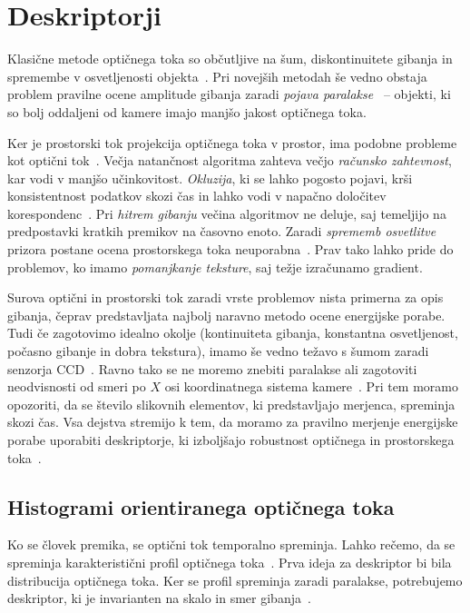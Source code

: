 \section{Deskriptorji}
Klasične metode optičnega toka so občutljive na šum, diskontinuitete gibanja in spremembe v osvetljenosti objekta~\cite{brox2011large}. Pri novejših metodah še vedno obstaja problem pravilne ocene amplitude gibanja zaradi \emph{pojava paralakse}~\cite{xu2012scale} -- objekti, ki so bolj oddaljeni od kamere imajo manjšo jakost optičnega toka. 


Ker je prostorski tok projekcija optičnega toka v prostor, ima podobne probleme kot optični tok~\cite{yan2016scene}. Večja natančnost algoritma zahteva večjo \emph{računsko zahtevnost}, kar vodi v manjšo učinkovitost. \emph{Okluzija}, ki se lahko pogosto pojavi, krši konsistentnost podatkov skozi čas in lahko vodi v napačno določitev korespondenc~\cite{yan2016scene}. Pri \emph{hitrem gibanju} večina algoritmov ne deluje, saj temeljijo na predpostavki kratkih premikov na časovno enoto. Zaradi \emph{sprememb osvetlitve} prizora postane ocena prostorskega toka neuporabna~\cite{yan2016scene}. Prav tako lahko pride do problemov, ko imamo \emph{pomanjkanje teksture}, saj težje izračunamo gradient.

Surova optični in prostorski tok zaradi vrste problemov nista primerna za opis gibanja, čeprav predstavljata najbolj naravno metodo ocene energijske porabe. Tudi če zagotovimo idealno okolje (kontinuiteta gibanja, konstantna osvetljenost, počasno gibanje in dobra tekstura), imamo še vedno težavo s šumom zaradi senzorja CCD~\cite{wedel2011stereo}. Ravno tako se ne moremo znebiti paralakse ali zagotoviti neodvisnosti od smeri po $X$ osi koordinatnega sistema kamere~\cite{chaudhry2009histograms}. Pri tem moramo opozoriti, da se število slikovnih elementov, ki predstavljajo merjenca, spreminja skozi čas. Vsa dejstva stremijo k tem, da moramo za pravilno merjenje energijske porabe uporabiti deskriptorje, ki izboljšajo robustnost optičnega in prostorskega toka~\cite{chaudhry2009histograms}. 







\subsection{Histogrami orientiranega optičnega toka}\label{sec:hoof}
Ko se človek premika, se optični tok temporalno spreminja. Lahko rečemo, da se spreminja karakteristični profil optičnega toka~\cite{chaudhry2009histograms}. Prva ideja za deskriptor bi bila distribucija optičnega toka. Ker se profil spreminja zaradi paralakse, potrebujemo deskriptor, ki je invarianten na skalo in smer gibanja~\cite{chaudhry2009histograms}.

